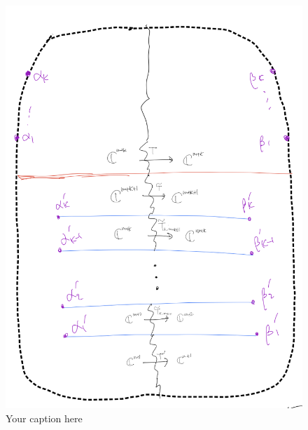 \begin{figure}[H] %
    \centering
    \includegraphics[width=\linewidth]{diagrams/lemma6/4.png} %
    \caption{Your caption here}
    \label{fig:your-label}
\end{figure}